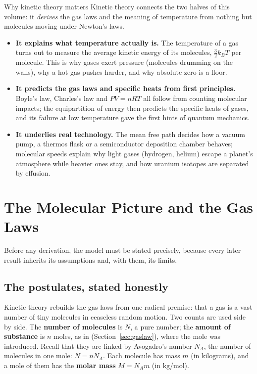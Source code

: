 \begin{motivbox}{Why kinetic theory matters}
Kinetic theory connects the two halves of this volume: it \emph{derives} the gas laws and the meaning of
temperature from nothing but molecules moving under Newton's laws.
\begin{itemize}
\item \textbf{It explains what temperature actually is.} The temperature of a gas turns out to measure
the average kinetic energy of its molecules, $\tfrac32 k_BT$ per molecule. This is why gases exert
pressure (molecules drumming on the walls), why a hot gas pushes harder, and why absolute zero is a floor.
\item \textbf{It predicts the gas laws and specific heats from first principles.} Boyle's law, Charles's
law and $PV=nRT$ all follow from counting molecular impacts; the equipartition of energy then predicts
the specific heats of gases, and its failure at low temperature gave the first hints of quantum mechanics.
\item \textbf{It underlies real technology.} The mean free path decides how a vacuum pump, a thermos
flask or a semiconductor deposition chamber behaves; molecular speeds explain why light gases (hydrogen,
helium) escape a planet's atmosphere while heavier ones stay, and how uranium isotopes are separated by
effusion.
\end{itemize}
\end{motivbox}

\section{The Molecular Picture and the Gas Laws}\label{sec:ktpicture}

Before any derivation, the model must be stated precisely, because every later result inherits its
assumptions and, with them, its limits.

\subsection{The postulates, stated honestly}

Kinetic theory rebuilds the gas laws from one radical premise: that a gas is a vast number of tiny
molecules in ceaseless random motion. Two counts are used side by side. The \textbf{number of molecules} is $N$, a pure
number; the \textbf{amount of substance} is $n$ moles, as in  (Section~\ref{sec:gaslaw}), where the mole was introduced. Recall that they are linked by Avogadro's number $N_A$, the number of molecules in one mole: $N=nN_A$. Each molecule has mass $m$ (in
kilograms), and a mole of them has the \textbf{molar mass} $M=N_Am$ (in \si{kg/mol}).

